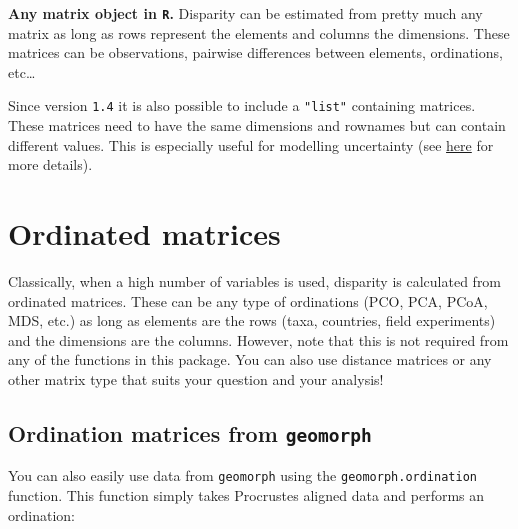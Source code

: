 \documentclass[]{book}
\newenvironment{Shaded}{\begin{snugshade}}{\end{snugshade}}
\newcommand{\CommentTok}[1]{\textcolor[rgb]{0.56,0.35,0.01}{\textit{#1}}}
\newcommand{\DataTypeTok}[1]{\textcolor[rgb]{0.13,0.29,0.53}{#1}}
\newcommand{\DecValTok}[1]{\textcolor[rgb]{0.00,0.00,0.81}{#1}}
\newcommand{\KeywordTok}[1]{\textcolor[rgb]{0.13,0.29,0.53}{\textbf{#1}}}
\newcommand{\NormalTok}[1]{#1}
\newcommand{\OperatorTok}[1]{\textcolor[rgb]{0.81,0.36,0.00}{\textbf{#1}}}
\newcommand{\OtherTok}[1]{\textcolor[rgb]{0.56,0.35,0.01}{#1}}
\newcommand{\StringTok}[1]{\textcolor[rgb]{0.31,0.60,0.02}{#1}}
\begin{document}
\textbf{Any matrix object in \texttt{R}.}
Disparity can be estimated from pretty much any matrix as long as rows represent the elements and columns the dimensions.
These matrices can be observations, pairwise differences between elements, ordinations, etc\ldots{}

Since version \texttt{1.4} it is also possible to include a \texttt{"list"} containing matrices.
These matrices need to have the same dimensions and rownames but can contain different values.
This is especially useful for modelling uncertainty (see \protect\hyperlink{multi.input}{here} for more details).

\hypertarget{ordinated-matrices}{%
\section{Ordinated matrices}\label{ordinated-matrices}}

Classically, when a high number of variables is used, disparity is calculated from ordinated matrices.
These can be any type of ordinations (PCO, PCA, PCoA, MDS, etc.) as long as elements are the rows (taxa, countries, field experiments) and the dimensions are the columns.
However, note that this is not required from any of the functions in this package.
You can also use distance matrices or any other matrix type that suits your question and your analysis!

\hypertarget{ordination-matrices-from-geomorph}{%
\subsection{\texorpdfstring{Ordination matrices from \texttt{geomorph}}{Ordination matrices from geomorph}}\label{ordination-matrices-from-geomorph}}

You can also easily use data from \texttt{geomorph} using the \texttt{geomorph.ordination} function.
This function simply takes Procrustes aligned data and performs an ordination:

\begin{Shaded}
\end{Shaded}
\end{document}
